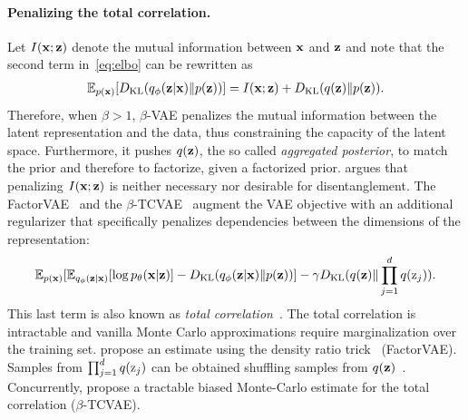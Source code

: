 \paragraph{Penalizing the total correlation.}
Let $I({\mathbf{x}}; {\mathbf{z}})$ denote the mutual information between ${\mathbf{x}}$ and ${\mathbf{z}}$ and note that the second term in~\eqref{eq:elbo} can be rewritten as 
\begin{align*}
\mathbb{E}_{p({\mathbf{x}})} [D_{\mathrm{KL}}(q_\phi({\mathbf{z}}|{\mathbf{x}}) \| p({\mathbf{z}}))] = I({\mathbf{x}};{\mathbf{z}}) + D_{\mathrm{KL}}(q({\mathbf{z}}) \| p({\mathbf{z}})).
\end{align*}
Therefore, when $\beta>1$, $\beta$-VAE penalizes the mutual information between the latent representation and the data, thus constraining the capacity of the latent space. Furthermore, it pushes $q({\mathbf{z}})$, the so called \textit{aggregated posterior}, to match the prior and therefore to factorize, given a factorized prior. 
\citet{kim2018disentangling} argues that penalizing $I({\mathbf{x}};{\mathbf{z}})$ is neither necessary nor desirable for disentanglement. The FactorVAE~\citep{kim2018disentangling} and the $\beta$-TCVAE~\citep{chen2018isolating} augment the VAE objective with an additional regularizer that specifically penalizes dependencies between the dimensions of the representation:
\begin{align*}
\mathbb{E}_{p({\mathbf{x}})} [\mathbb{E}_{q_\phi({\mathbf{z}}|{\mathbf{x}})}[\log p_\theta({\mathbf{x}}|{\mathbf{z}})] -  D_{\mathrm{KL}}(q_\phi({\mathbf{z}}|{\mathbf{x}}) \| p({\mathbf{z}}))] - \gamma D_{\mathrm{KL}}(q({\mathbf{z}})\| \prod_{j=1}^d q({\textnormal{z}}_j)).
\end{align*}
This last term is also known as \textit{total correlation}~\citep{watanabe1960information}. The total correlation is intractable and vanilla Monte Carlo approximations require marginalization over the training set. \citep{kim2018disentangling} propose an estimate using the density ratio trick~\citep{nguyen2010estimating,sugiyama2012density} (FactorVAE). Samples from $\prod_{j=1}^d q({\textnormal{z}}_j)$ can be obtained shuffling samples from $q({\mathbf{z}})$~\citep{arcones1992bootstrap}. Concurrently, \citet{chen2018isolating} propose a tractable biased Monte-Carlo estimate for the total correlation ($\beta$-TCVAE).


